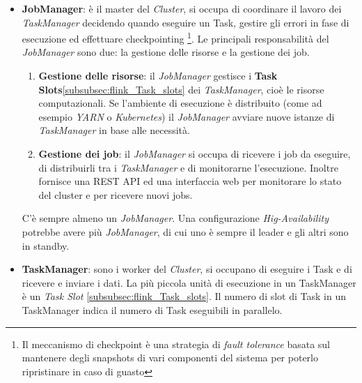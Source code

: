 \begin{itemize}
    \item \textbf{JobManager}: è il master del \textit{Cluster}, si occupa di coordinare il lavoro dei \textit{TaskManager} decidendo quando eseguire un Task,
    gestire gli errori in fase di esecuzione ed effettuare checkpointing 
    \footnote{Il meccanismo di checkpoint è una strategia di \textit{fault tolerance} basata sul mantenere degli snapshots di vari componenti del sistema
    per poterlo ripristinare in caso di guasto}.
    Le principali responsabilità del \textit{JobManager} sono due: la gestione delle risorse e la gestione dei job.
    \begin{enumerate}
        \item \textbf{Gestione delle risorse}: il \textit{JobManager} gestisce i \textbf{Task Slots}\ref{subsubsec:flink_Task_slots} dei \textit{TaskManager}, cioè le risorse computazionali.
        Se l'ambiente di esecuzione è distribuito (come ad esempio \textit{YARN} o \textit{Kubernetes}) il \textit{JobManager} avviare nuove istanze di \textit{TaskManager} in base alle necessità.
        \item \textbf{Gestione dei job}: il \textit{JobManager} si occupa di ricevere i job da eseguire, di distribuirli tra i \textit{TaskManager} e di monitorarne l'esecuzione.
        Inoltre fornisce una REST API ed una interfaccia web per monitorare lo stato del cluster e per ricevere nuovi jobs.
    \end{enumerate}
    C'è sempre almeno un \textit{JobManager}. Una configurazione \textit{Hig-Availability} potrebbe avere più \textit{JobManager}, di cui uno è sempre il leader e gli altri sono in standby.
    \item \textbf{TaskManager}: sono i worker del \textit{Cluster}, si occupano di eseguire i Task e di ricevere e inviare i dati.
    La più piccola unità di esecuzione in un TaskManager è un \textit{Task Slot} \ref{subsubsec:flink_Task_slots}.
    Il numero di slot di Task in un TaskManager indica il numero di Task eseguibili in parallelo.
\end{itemize}

